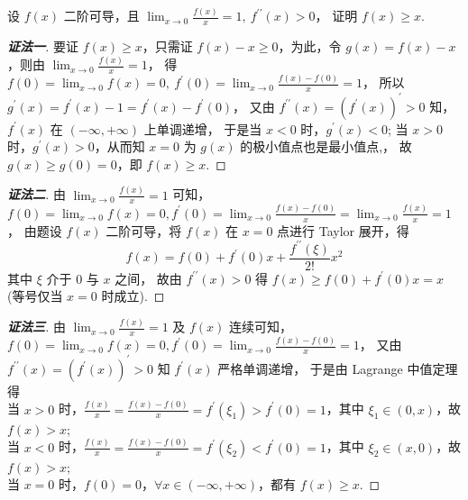 \begin{example}[1995 数学 (二)]
    设 $ f(x) $ 二阶可导，且 $ \displaystyle\lim _{x \rightarrow 0} \frac{f(x)}{x}=1,~f^{\prime \prime}(x)>0$，
    证明 $ f(x) \geqslant x .$
\end{example}

\begin{proof}[{\songti \textbf{证法一}}]
    要证 $ f(x) \geqslant x$，只需证 $ f(x)-x \geqslant 0$，为此，令 $ g(x)=f(x)-x$，则由 $\displaystyle \lim _{x \rightarrow 0} \frac{f(x)}{x}=1$，
    得 $\displaystyle f(0)=\lim _{x \rightarrow 0} f(x)=0,~f^{\prime}(0)=\lim _{x \rightarrow 0} \frac{f(x)-f(0)}{x}=1$，
    所以 $ g^{\prime}(x)=f^{\prime}(x)-1=f^{\prime}(x)-f^{\prime}(0)$，
    又由 $ f^{\prime \prime}(x)=\left(f^{\prime}(x)\right)^{\prime}>0 $ 知，$f^{\prime}(x)$  在 $ (-\infty,+\infty)$ 上单调递增，
    于是当 $ x<0 $ 时，$g^{\prime}(x)<0$; 当 $ x>0 $ 时，$g^{\prime}(x)>0$，从而知 $ x=0 $ 为 $ g(x) $ 的极小值点也是最小值点,，
    故 $ g(x) \geqslant g(0)=0$，即 $ f(x) \geqslant x .$
\end{proof}
\begin{proof}[{\songti \textbf{证法二}}]
    由 $\displaystyle \lim _{x \rightarrow 0} \frac{f(x)}{x}=1 $ 可知，$\displaystyle f(0)=\lim _{x \rightarrow 0} f(x)=0, f^{\prime}(0)=\lim _{x \rightarrow 0} \frac{f(x)-f(0)}{x}= \lim _{x \rightarrow 0} \frac{f(x)}{x}=1$，
    由题设 $ f(x) $ 二阶可导，将 $ f(x) $ 在 $ x=0 $ 点进行 Taylor 展开，得
    $$f(x)=f(0)+f^{\prime}(0) x+\frac{f^{\prime \prime}(\xi)}{2 !} x^{2}$$
    其中 $ \xi $ 介于 $0$ 与 $ x $ 之间，
    故由 $ f^{\prime \prime}(x)>0 $ 得 $ f(x) \geqslant f(0)+f^{\prime}(0) x=x $ (等号仅当 $ x=0 $ 时成立).
\end{proof}
\begin{proof}[{\songti \textbf{证法三}}]
    由 $\displaystyle \lim _{x \rightarrow 0} \frac{f(x)}{x}=1 $ 及 $ f(x) $ 连续可知，$\displaystyle f(0)=\lim _{x \rightarrow 0} f(x)=0, f^{\prime}(0)= \lim _{x \rightarrow 0} \frac{f(x)-f(0)}{x}=1$，
    又由 $ f^{\prime \prime}(x)=\left(f^{\prime}(x)\right)^{\prime}>0 $ 知 $ f^{\prime}(x) $ 严格单调递增， 于是由 Lagrange 中值定理得\\
    当 $ x>0 $ 时，$\displaystyle\frac{f(x)}{x}=\frac{f(x)-f(0)}{x}=f^{\prime}\left(\xi_{1}\right)>f^{\prime}(0)=1$，其中 $ \xi_{1} \in(0, x)$，故 $ f(x)>x$; \\
    当 $ x<0 $ 时，$\displaystyle\frac{f(x)}{x}=\frac{f(x)-f(0)}{x}=f^{\prime}\left(\xi_{2}\right)<f^{\prime}(0)=1$，其中 $ \xi_{2} \in(x, 0)$，故 $ f(x)>x$; \\
    当 $ x=0 $ 时，$f(0)=0$，$\forall x \in(-\infty,+\infty)$，都有 $ f(x) \geqslant x .$
\end{proof}

